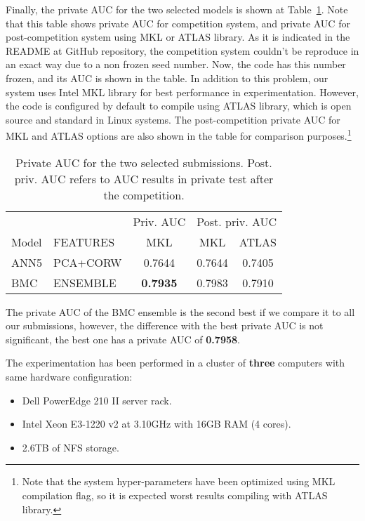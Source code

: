 \documentclass[a4paper,english,twoside]{article}
\begin{document}
Finally, the private AUC for the two selected models is shown at
Table~\ref{tab:private}. Note that this table shows private AUC for competition
system, and private AUC for post-competition system using MKL or ATLAS
library. As it is indicated in the README at GitHub repository, the competition
system couldn't be reproduce in an exact way due to a non frozen seed number.
Now, the code has this number frozen, and its AUC is shown in the table. In
addition to this problem, our system uses Intel MKL library for best performance
in experimentation. However, the code is configured by default to compile using
ATLAS library, which is open source and standard in Linux systems. The
post-competition private AUC for MKL and ATLAS options are also shown in the
table for comparison purposes.\footnote{Note that the system hyper-parameters
  have been optimized using MKL compilation flag, so it is expected worst
  results compiling with ATLAS library.}

\begin{table}
  \centering
  \begin{tabular}{|l|l|c||c|c|}
    \hline
          &          & Priv. AUC & \multicolumn{2}{|c|}{Post. priv. AUC}\\
    Model & FEATURES & MKL & \multicolumn{1}{|c}{MKL} & \multicolumn{1}{c|}{ATLAS} \\
    \hline
    \hline
    ANN5 & PCA+CORW & 0.7644          & 0.7644 & 0.7405\\
    BMC & ENSEMBLE & \textbf{0.7935}  & 0.7983 & 0.7910\\
    \hline
  \end{tabular}
  \caption{Private AUC for the two selected submissions. Post. priv. AUC refers
    to AUC results in private test after the competition.\label{tab:private}}
\end{table}

The private AUC of the BMC ensemble is the second best if we compare it
to all our submissions, however, the difference with the best private
AUC is not significant, the best one has a private AUC of
\textbf{0.7958}.

The experimentation has been performed in a cluster of \textbf{three}
computers with same hardware configuration:

\begin{itemize}
\item
  Dell PowerEdge 210 II server rack.
\item
  Intel Xeon E3-1220 v2 at 3.10GHz with 16GB RAM (4 cores).
\item
  2.6TB of NFS storage.
\end{itemize}
\end{document}
